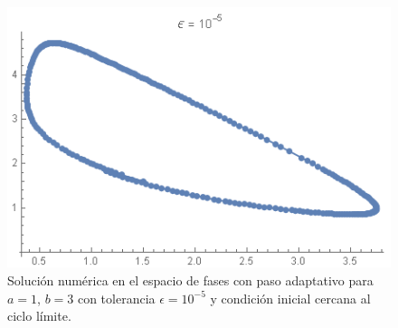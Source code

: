 \documentclass[aps,prb,twocolumn,superscriptaddress,floatfix,longbibliography]{revtex4-2}
\newcounter{para}
\begin{document}
\begin{figure}[]
    \includegraphics[clip=true,width=0.8\columnwidth]{4_fases_5.png}
    \caption{Solución numérica en el espacio de fases con paso adaptativo para $a = 1$, $b = 3$ con tolerancia $\epsilon = 10^{-5}$ y condición inicial cercana al ciclo límite.}
     \label{fig:4_fases_5}
\end{figure}



\end{document}
